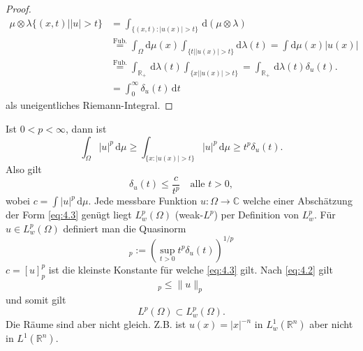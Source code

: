 \documentclass[
paper=a4,
bibtotocnumbered,
liststotocnumbered,
tablecaptionabove,
pointlessnumbers,
twoside,
openright,
10pt
]
{report}
\theoremstyle{definition}
\numberwithin{equation}{chapter}
\begin{document}
\begin{proof}
\begin{align}
\mu \otimes \lambda\{(x,t) | |u|>t\} &= \int_{\{(x,t): |u(x)|>t\}} \, \mathrm d(\mu \otimes \lambda)\\
&\stackrel{\text{Fub.}}= \int_\Omega \mathrm d\mu(x) \int_{\{t| |u(x)|>t\}} \mathrm d\lambda(t) = \int \mathrm d\mu(x) |u(x)| \\
&\stackrel{\text{Fub.}}= \int_{\mathbb R_+} \, \mathrm  d\lambda(t) \int_{\{x| |u(x)|>t\}} = \int_{\mathbb R_+} \, \mathrm d\lambda(t) \delta_u(t).\\
&= \int_0^\infty \delta_u(t) \, \mathrm dt
\end{align}
als uneigentliches Riemann-Integral. \end{proof}
 Ist $0<p<\infty$, dann ist
\begin{equation}\label{eq:4.2}
\int_{\Omega} |u|^p \, \mathrm d\mu \ge \int_{\{x: |u(x)| >t\}} | u|^p \, \mathrm d\mu \ge t^p \delta_u(t).
\end{equation}
Also gilt
\begin{equation}\label{eq:4.3}
\delta_u(t) \le \frac{c}{t^p} \quad \text{alle } t>0,
\end{equation}
wobei $c= \int |u|^p \, \mathrm d\mu$. Jede messbare Funktion $u:\Omega \to \mathbb C$ welche einer Abschätzung der Form \eqref{eq:4.3} genügt liegt $L^p_w(\Omega)$ (weak-$L^p$) per Definition von $L^p_w$. Für $u\in L^p_w(\Omega)$ definiert man die Quasinorm
\begin{equation}
[u]_p:= (\sup_{t>0} t^p \delta_u(t))^{1/p}
\end{equation}
$c= [u]_p^p$ ist die kleinste Konstante für welche \eqref{eq:4.3} gilt. Nach \eqref{eq:4.2} gilt
\begin{equation}
[u]_p \le \| u\|_p
\end{equation}
und somit gilt
\begin{equation}
L^p(\Omega) \subset L^p_w(\Omega).
\end{equation}
Die Räume sind aber nicht gleich. Z.B. ist $u(x)= |x|^{-n}$ in $L^1_w(\mathbb R^n)$ aber nicht in $L^1(\mathbb R^n)$.
\end{document}

